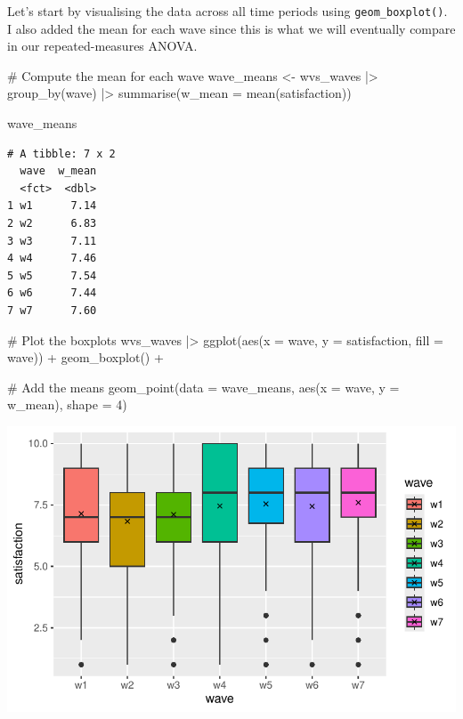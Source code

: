 \documentclass[
  letterpaper,
  DIV=11,
  numbers=noendperiod]{scrreprt}
\newenvironment{Shaded}{\begin{snugshade}}{\end{snugshade}}
\newcommand{\AttributeTok}[1]{\textcolor[rgb]{0.40,0.45,0.13}{#1}}
\newcommand{\CommentTok}[1]{\textcolor[rgb]{0.37,0.37,0.37}{#1}}
\newcommand{\DecValTok}[1]{\textcolor[rgb]{0.68,0.00,0.00}{#1}}
\newcommand{\FunctionTok}[1]{\textcolor[rgb]{0.28,0.35,0.67}{#1}}
\newcommand{\NormalTok}[1]{\textcolor[rgb]{0.00,0.23,0.31}{#1}}
\newcommand{\OtherTok}[1]{\textcolor[rgb]{0.00,0.23,0.31}{#1}}
\newcommand{\SpecialCharTok}[1]{\textcolor[rgb]{0.37,0.37,0.37}{#1}}
\begin{document}
Let's start by visualising the data across all time periods using
\texttt{geom\_boxplot()}. I also added the mean for each wave since this
is what we will eventually compare in our repeated-measures ANOVA.

\begin{Shaded}
\begin{Highlighting}[]
\CommentTok{\# Compute the mean for each wave}
\NormalTok{wave\_means }\OtherTok{\textless{}{-}}
\NormalTok{  wvs\_waves }\SpecialCharTok{|\textgreater{}}
  \FunctionTok{group\_by}\NormalTok{(wave) }\SpecialCharTok{|\textgreater{}}
  \FunctionTok{summarise}\NormalTok{(}\AttributeTok{w\_mean =} \FunctionTok{mean}\NormalTok{(satisfaction))}

\NormalTok{wave\_means}
\end{Highlighting}
\end{Shaded}

\begin{verbatim}
# A tibble: 7 x 2
  wave  w_mean
  <fct>  <dbl>
1 w1      7.14
2 w2      6.83
3 w3      7.11
4 w4      7.46
5 w5      7.54
6 w6      7.44
7 w7      7.60
\end{verbatim}

\begin{Shaded}
\begin{Highlighting}[]
\CommentTok{\# Plot the boxplots}
\NormalTok{wvs\_waves }\SpecialCharTok{|\textgreater{}}
  \FunctionTok{ggplot}\NormalTok{(}\FunctionTok{aes}\NormalTok{(}\AttributeTok{x =}\NormalTok{ wave,}
             \AttributeTok{y =}\NormalTok{ satisfaction,}
             \AttributeTok{fill =}\NormalTok{ wave)) }\SpecialCharTok{+}
  \FunctionTok{geom\_boxplot}\NormalTok{() }\SpecialCharTok{+}

  \CommentTok{\# Add the means}
  \FunctionTok{geom\_point}\NormalTok{(}\AttributeTok{data =}\NormalTok{ wave\_means,}
             \FunctionTok{aes}\NormalTok{(}\AttributeTok{x =}\NormalTok{ wave,}
                 \AttributeTok{y =}\NormalTok{ w\_mean),}
             \AttributeTok{shape =} \DecValTok{4}\NormalTok{)}
\end{Highlighting}
\end{Shaded}

\includegraphics{11_group_comparison_files/figure-pdf/multiple-paired-groups-boxplots-1.pdf}
\end{document}
